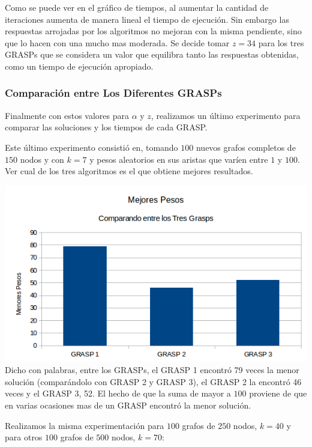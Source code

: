 Como se puede ver en el gráfico de tiempos, al aumentar la cantidad de iteraciones aumenta de manera lineal el tiempo de ejecución. Sin embargo las respuestas arrojadas por los algoritmos no mejoran con la misma pendiente, sino que lo hacen con una mucho mas moderada. Se decide tomar $z = 34$ para los tres GRASPs que se considera un valor que equilibra tanto las respuestas obtenidas, como un tiempo de ejecución apropiado. 

\subsubsection{Comparación entre Los Diferentes GRASPs}

Finalmente con estos valores para $\alpha$ y $z$, realizamos un último experimento para comparar las soluciones y los tiempos de cada GRASP.

Este último experimento consistió en, tomando $100$ nuevos grafos completos de $150$ nodos y con $k = 7$ y pesos aleatorios en sus aristas que varíen entre $1$ y $100$. Ver cual de los tres algoritmos es el que obtiene mejores resultados.

\includegraphics[scale=0.7]{Ej5/CompetenciaGRASPs1.png}\\

Dicho con palabras, entre los GRASPs, el GRASP 1 encontró 79 veces la menor solución (comparándolo con GRASP 2 y GRASP 3), el GRASP 2 la encontró 46 veces y el GRASP 3, 52. El hecho de que la suma de mayor a $100$ proviene de que en varias ocasiones mas de un GRASP encontró la menor solución.

Realizamos la misma experimentación para $100$ grafos de $250$ nodos, $k = 40$ y para otros $100$ grafos de $500$ nodos, $k = 70$:

